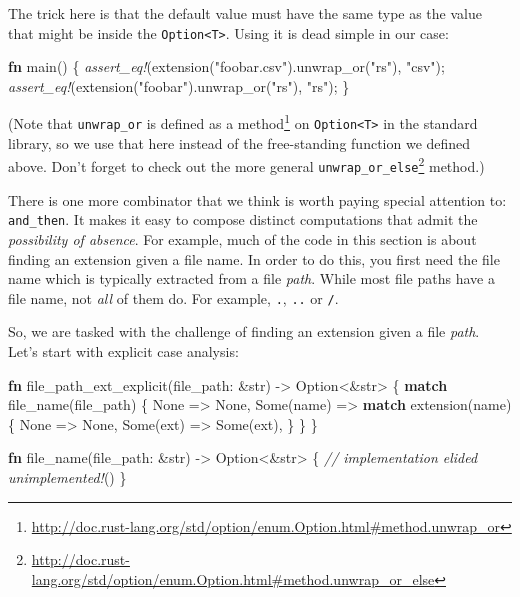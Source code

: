 \documentclass[a4paper,]{book}
\newenvironment{Shaded}{\begin{snugshade}}{\end{snugshade}}
\newcommand{\KeywordTok}[1]{\textcolor[rgb]{0.13,0.29,0.53}{\textbf{{#1}}}}
\newcommand{\DataTypeTok}[1]{\textcolor[rgb]{0.13,0.29,0.53}{{#1}}}
\newcommand{\ConstantTok}[1]{\textcolor[rgb]{0.00,0.00,0.00}{{#1}}}
\newcommand{\StringTok}[1]{\textcolor[rgb]{0.31,0.60,0.02}{{#1}}}
\newcommand{\CommentTok}[1]{\textcolor[rgb]{0.56,0.35,0.01}{\textit{{#1}}}}
\newcommand{\PreprocessorTok}[1]{\textcolor[rgb]{0.56,0.35,0.01}{\textit{{#1}}}}
\newcommand{\NormalTok}[1]{{#1}}
\renewcommand{\href}[2]{#2\footnote{\url{#1}}}
\begin{document}
The trick here is that the default value must have the same type as the
value that might be inside the
\texttt{Option\textless{}T\textgreater{}}. Using it is dead simple in
our case:

\begin{Shaded}
\begin{Highlighting}[]
\KeywordTok{fn} \NormalTok{main() \{}
    \PreprocessorTok{assert_eq!}\NormalTok{(extension(}\StringTok{"foobar.csv"}\NormalTok{).unwrap_or(}\StringTok{"rs"}\NormalTok{), }\StringTok{"csv"}\NormalTok{);}
    \PreprocessorTok{assert_eq!}\NormalTok{(extension(}\StringTok{"foobar"}\NormalTok{).unwrap_or(}\StringTok{"rs"}\NormalTok{), }\StringTok{"rs"}\NormalTok{);}
\NormalTok{\}}
\end{Highlighting}
\end{Shaded}

(Note that \texttt{unwrap\_or} is
\href{http://doc.rust-lang.org/std/option/enum.Option.html\#method.unwrap_or}{defined
as a method} on \texttt{Option\textless{}T\textgreater{}} in the
standard library, so we use that here instead of the free-standing
function we defined above. Don't forget to check out the more general
\href{http://doc.rust-lang.org/std/option/enum.Option.html\#method.unwrap_or_else}{\texttt{unwrap\_or\_else}}
method.)

There is one more combinator that we think is worth paying special
attention to: \texttt{and\_then}. It makes it easy to compose distinct
computations that admit the \emph{possibility of absence}. For example,
much of the code in this section is about finding an extension given a
file name. In order to do this, you first need the file name which is
typically extracted from a file \emph{path}. While most file paths have
a file name, not \emph{all} of them do. For example, \texttt{.},
\texttt{..} or \texttt{/}.

So, we are tasked with the challenge of finding an extension given a
file \emph{path}. Let's start with explicit case analysis:

\begin{Shaded}
\begin{Highlighting}[]
\KeywordTok{fn} \NormalTok{file_path_ext_explicit(file_path: &}\DataTypeTok{str}\NormalTok{) -> }\DataTypeTok{Option}\NormalTok{<&}\DataTypeTok{str}\NormalTok{> \{}
    \KeywordTok{match} \NormalTok{file_name(file_path) \{}
        \ConstantTok{None} \NormalTok{=> }\ConstantTok{None}\NormalTok{,}
        \ConstantTok{Some}\NormalTok{(name) => }\KeywordTok{match} \NormalTok{extension(name) \{}
            \ConstantTok{None} \NormalTok{=> }\ConstantTok{None}\NormalTok{,}
            \ConstantTok{Some}\NormalTok{(ext) => }\ConstantTok{Some}\NormalTok{(ext),}
        \NormalTok{\}}
    \NormalTok{\}}
\NormalTok{\}}

\KeywordTok{fn} \NormalTok{file_name(file_path: &}\DataTypeTok{str}\NormalTok{) -> }\DataTypeTok{Option}\NormalTok{<&}\DataTypeTok{str}\NormalTok{> \{}
  \CommentTok{// implementation elided}
  \PreprocessorTok{unimplemented!}\NormalTok{()}
\NormalTok{\}}
\end{Highlighting}
\end{Shaded}
\end{document}
